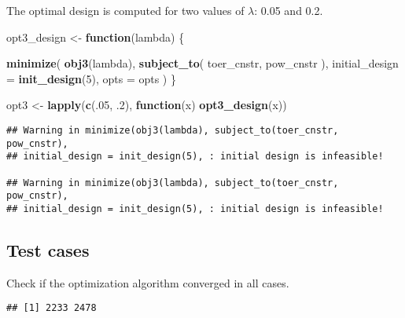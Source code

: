 \documentclass[]{book}
\newenvironment{Shaded}{\begin{snugshade}}{\end{snugshade}}
\newcommand{\ControlFlowTok}[1]{\textcolor[rgb]{0.13,0.29,0.53}{\textbf{#1}}}
\newcommand{\DataTypeTok}[1]{\textcolor[rgb]{0.13,0.29,0.53}{#1}}
\newcommand{\DecValTok}[1]{\textcolor[rgb]{0.00,0.00,0.81}{#1}}
\newcommand{\FloatTok}[1]{\textcolor[rgb]{0.00,0.00,0.81}{#1}}
\newcommand{\KeywordTok}[1]{\textcolor[rgb]{0.13,0.29,0.53}{\textbf{#1}}}
\newcommand{\NormalTok}[1]{#1}
\newcommand{\OperatorTok}[1]{\textcolor[rgb]{0.81,0.36,0.00}{\textbf{#1}}}
\newcommand{\StringTok}[1]{\textcolor[rgb]{0.31,0.60,0.02}{#1}}
\begin{document}
The optimal design is computed for two values of \(\lambda\): 0.05 and 0.2.

\begin{Shaded}
\begin{Highlighting}[]
\NormalTok{opt3_design <-}\StringTok{ }\ControlFlowTok{function}\NormalTok{(lambda) \{}

    \KeywordTok{minimize}\NormalTok{(}
        \KeywordTok{obj3}\NormalTok{(lambda),}
        \KeywordTok{subject_to}\NormalTok{(}
\NormalTok{            toer_cnstr,}
\NormalTok{            pow_cnstr}
\NormalTok{        ),}
        \DataTypeTok{initial_design =} \KeywordTok{init_design}\NormalTok{(}\DecValTok{5}\NormalTok{),}
        \DataTypeTok{opts =}\NormalTok{ opts}
\NormalTok{    )}
\NormalTok{\}}

\NormalTok{opt3 <-}\StringTok{ }\KeywordTok{lapply}\NormalTok{(}\KeywordTok{c}\NormalTok{(.}\DecValTok{05}\NormalTok{, }\FloatTok{.2}\NormalTok{), }\ControlFlowTok{function}\NormalTok{(x) }\KeywordTok{opt3_design}\NormalTok{(x))}
\end{Highlighting}
\end{Shaded}

\begin{verbatim}
## Warning in minimize(obj3(lambda), subject_to(toer_cnstr, pow_cnstr),
## initial_design = init_design(5), : initial design is infeasible!

## Warning in minimize(obj3(lambda), subject_to(toer_cnstr, pow_cnstr),
## initial_design = init_design(5), : initial design is infeasible!
\end{verbatim}

\hypertarget{test-cases-12}{%
\subsection{Test cases}\label{test-cases-12}}

Check if the optimization algorithm converged in all cases.

\begin{Shaded}
\end{Shaded}

\begin{verbatim}
## [1] 2233 2478
\end{verbatim}
\end{document}
